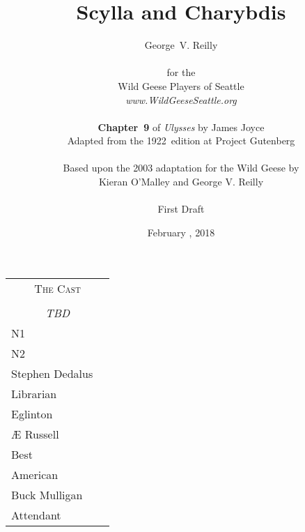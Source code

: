 


\title{\Huge Scylla and Charybdis}
\author{George~V. Reilly\\
\\
{\small for the}\\
Wild Geese Players of Seattle\\
{\textit{www.WildGeeseSeattle.org}}\\
\\
{\small \textbf{Chapter~9} of \textit{Ulysses} by James Joyce}\\
{\small Adapted from the 1922~edition at Project Gutenberg}
\\
\\
{\small Based upon the 2003 adaptation for the Wild Geese by}\\
{\small Kieran O'Malley and George V. Reilly}\\
\\
{\small First Draft}}
\date{February , 2018}
\raggedbottom



\maketitle
\thispagestyle{empty}
\pagebreak

\begin{tabular}{lp{10cm}}
    \multicolumn{2}{c}{\Large \textsc{The Cast}} \\
\\
    \multicolumn{2}{c}{\large \textit{TBD}} \\
N1 \\
N2 \\
Stephen Dedalus \\
Librarian \\
Eglinton \\
Æ Russell \\
Best \\
American \\
Buck Mulligan \\
Attendant \\
\end{tabular}

\thispagestyle{empty}
\newpage


\setcounter{page}{1}

